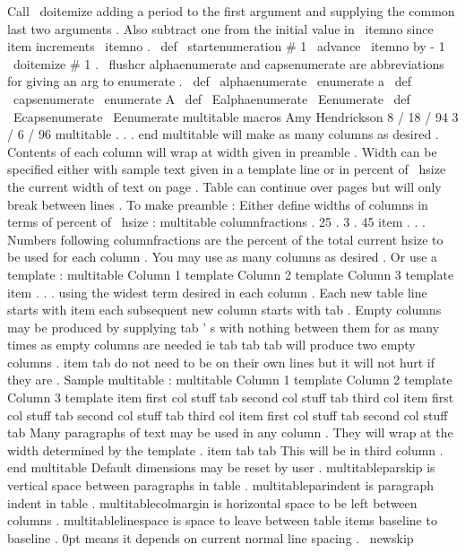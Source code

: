 %
Call
\
doitemize
adding
a
period
to
the
first
argument
and
supplying
the
%
common
last
two
arguments
.
Also
subtract
one
from
the
initial
value
in
%
\
itemno
since
item
increments
\
itemno
.
%
\
def
\
startenumeration
#
1
{
%
\
advance
\
itemno
by
-
1
\
doitemize
{
#
1
.
}
\
flushcr
}
%
alphaenumerate
and
capsenumerate
are
abbreviations
for
giving
an
arg
%
to
enumerate
.
%
\
def
\
alphaenumerate
{
\
enumerate
{
a
}
}
\
def
\
capsenumerate
{
\
enumerate
{
A
}
}
\
def
\
Ealphaenumerate
{
\
Eenumerate
}
\
def
\
Ecapsenumerate
{
\
Eenumerate
}
%
multitable
macros
%
Amy
Hendrickson
8
/
18
/
94
3
/
6
/
96
%
%
multitable
.
.
.
end
multitable
will
make
as
many
columns
as
desired
.
%
Contents
of
each
column
will
wrap
at
width
given
in
preamble
.
Width
%
can
be
specified
either
with
sample
text
given
in
a
template
line
%
or
in
percent
of
\
hsize
the
current
width
of
text
on
page
.
%
Table
can
continue
over
pages
but
will
only
break
between
lines
.
%
To
make
preamble
:
%
%
Either
define
widths
of
columns
in
terms
of
percent
of
\
hsize
:
%
multitable
columnfractions
.
25
.
3
.
45
%
item
.
.
.
%
%
Numbers
following
columnfractions
are
the
percent
of
the
total
%
current
hsize
to
be
used
for
each
column
.
You
may
use
as
many
%
columns
as
desired
.
%
Or
use
a
template
:
%
multitable
{
Column
1
template
}
{
Column
2
template
}
{
Column
3
template
}
%
item
.
.
.
%
using
the
widest
term
desired
in
each
column
.
%
Each
new
table
line
starts
with
item
each
subsequent
new
column
%
starts
with
tab
.
Empty
columns
may
be
produced
by
supplying
tab
'
s
%
with
nothing
between
them
for
as
many
times
as
empty
columns
are
needed
%
ie
tab
tab
tab
will
produce
two
empty
columns
.
%
item
tab
do
not
need
to
be
on
their
own
lines
but
it
will
not
hurt
%
if
they
are
.
%
Sample
multitable
:
%
multitable
{
Column
1
template
}
{
Column
2
template
}
{
Column
3
template
}
%
item
first
col
stuff
tab
second
col
stuff
tab
third
col
%
item
%
first
col
stuff
%
tab
%
second
col
stuff
%
tab
%
third
col
%
item
first
col
stuff
tab
second
col
stuff
%
tab
Many
paragraphs
of
text
may
be
used
in
any
column
.
%
%
They
will
wrap
at
the
width
determined
by
the
template
.
%
item
tab
tab
This
will
be
in
third
column
.
%
end
multitable
%
Default
dimensions
may
be
reset
by
user
.
%
multitableparskip
is
vertical
space
between
paragraphs
in
table
.
%
multitableparindent
is
paragraph
indent
in
table
.
%
multitablecolmargin
is
horizontal
space
to
be
left
between
columns
.
%
multitablelinespace
is
space
to
leave
between
table
items
baseline
%
to
baseline
.
%
0pt
means
it
depends
on
current
normal
line
spacing
.
%
\
newskip
